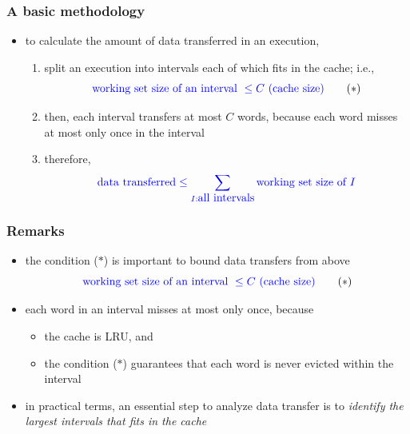 \documentclass[12pt,dvipdfmx]{beamer}
\newcommand{\ao}[1]{{\color{blue}#1}}
\begin{document}
\begin{frame}
\frametitle{A basic methodology}

\begin{itemize}
\item [] to calculate the amount of data 
  transferred in an execution,

  \begin{enumerate}
  \item<1-> split an execution into intervals each of which
    fits in the cache; i.e.,
    \[ \ao{\mbox{working set size of an interval } \leq C \mbox{ (cache size)}} \quad\quad (\ast) \]

  \item<2-> then, each interval transfers at most $C$ words, 
    because
    each word misses at most only once in the interval

  \item<3-> therefore,
    \[ 
    \ao{\mbox{data transferred} \leq \sum_{I : \mbox{all intervals}}
    \mbox{working set size of }I} \]
    \end{enumerate}
  \end{itemize}

\begin{center}
\def\svgwidth{0.7\textwidth}
{\footnotesize}
\end{center}

\end{frame}


\begin{frame}
\frametitle{Remarks}
\begin{itemize}
\item<1-> the condition ($\ast$) is important to bound 
  data transfers from above
  \[ \ao{\mbox{working set size of an interval } \leq C \mbox{ (cache size)}} \quad\quad (\ast) \]

\item<2-> each word in an interval misses at most only once, because
  \begin{itemize}
  \item the cache is LRU, and
  \item the condition ($\ast$) guarantees 
    that each word is never evicted within the interval
  \end{itemize}

\item<3-> in practical terms, an essential step to
  analyze data transfer is to \ao{\em identify the
    largest intervals that fits in the cache}
\end{itemize}
\end{frame}
\end{document}
